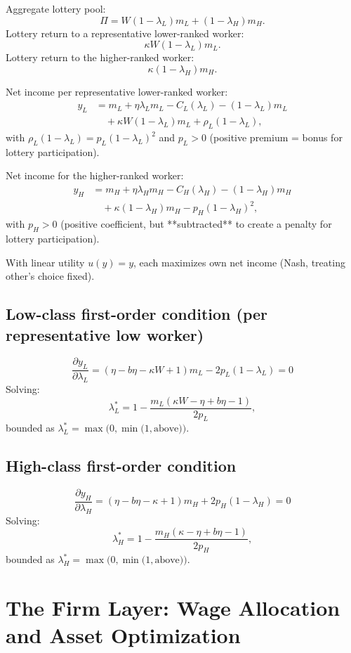 \documentclass[11pt]{article}
\begin{document}
Aggregate lottery pool:
\[
\Pi = W (1 - \lambda_L) m_L + (1 - \lambda_H) m_H.
\]
Lottery return to a representative lower-ranked worker:
\[
\kappa W (1 - \lambda_L) m_L.
\]
Lottery return to the higher-ranked worker:
\[
\kappa (1 - \lambda_H) m_H.
\]

Net income per representative lower-ranked worker:
\begin{align*}
y_L &= m_L + \eta \lambda_L m_L - C_L(\lambda_L) - (1 - \lambda_L) m_L \\
    &\quad + \kappa W (1 - \lambda_L) m_L + \rho_L(1 - \lambda_L),
\end{align*}
with $\rho_L(1 - \lambda_L) = p_L (1 - \lambda_L)^2$ and $p_L > 0$ (positive premium = bonus for lottery participation).

Net income for the higher-ranked worker:
\begin{align*}
y_H &= m_H + \eta \lambda_H m_H - C_H(\lambda_H) - (1 - \lambda_H) m_H \\
    &\quad + \kappa (1 - \lambda_H) m_H - p_H (1 - \lambda_H)^2,
\end{align*}
with $p_H > 0$ (positive coefficient, but **subtracted** to create a penalty for lottery participation).

With linear utility $u(y) = y$, each maximizes own net income (Nash, treating other's choice fixed).

\subsection{Low-class first-order condition (per representative low worker)}
\[
\frac{\partial y_L}{\partial \lambda_L} = (\eta - b\eta - \kappa W + 1) m_L - 2 p_L (1 - \lambda_L) = 0
\]
Solving:
\[
\lambda_L^* = 1 - \frac{m_L (\kappa W - \eta + b\eta - 1)}{2 p_L},
\]
bounded as $\lambda_L^* = \max\!\bigl(0, \min\!\bigl(1, \text{above}\bigr)\bigr)$.

\subsection{High-class first-order condition}
\[
\frac{\partial y_H}{\partial \lambda_H} = (\eta - b\eta - \kappa + 1) m_H + 2 p_H (1 - \lambda_H) = 0
\]
Solving:
\[
\lambda_H^* = 1 - \frac{m_H (\kappa - \eta + b\eta - 1)}{2 p_H},
\]
bounded as $\lambda_H^* = \max\!\bigl(0, \min\!\bigl(1, \text{above}\bigr)\bigr)$.

\section{The Firm Layer: Wage Allocation and Asset Optimization}
\end{document}
